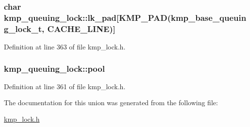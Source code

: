 \hypertarget{unionkmp__queuing__lock_a3f277c8bd18feb404b759189e867c64c}{
\subsubsection[{lk\-\_\-pad}]{\setlength{\rightskip}{0pt plus 5cm}char kmp\-\_\-queuing\-\_\-lock\-::lk\-\_\-pad\mbox{[}{\bf K\-M\-P\-\_\-\-P\-A\-D}({\bf kmp\-\_\-base\-\_\-queuing\-\_\-lock\-\_\-t}, {\bf C\-A\-C\-H\-E\-\_\-\-L\-I\-N\-E})\mbox{]}}}\label{unionkmp__queuing__lock_a3f277c8bd18feb404b759189e867c64c}


Definition at line 363 of file kmp\-\_\-lock.\-h.

\hypertarget{unionkmp__queuing__lock_af7aec478c8146a10357708c638cd63e5}{
\subsubsection[{pool}]{ kmp\-\_\-queuing\-\_\-lock\-::pool}}\label{unionkmp__queuing__lock_af7aec478c8146a10357708c638cd63e5}


Definition at line 361 of file kmp\-\_\-lock.\-h.



The documentation for this union was generated from the following file\-:\begin{DoxyCompactItemize}
\item 
\hyperlink{kmp__lock_8h}{kmp\-\_\-lock.\-h}\end{DoxyCompactItemize}

